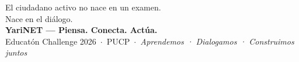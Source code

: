 \documentclass[a4paper, 11pt]{article}
\begin{document}
\vspace{6pt}
\begin{tcolorbox}[
  enhanced,
  colback=yblue,
  colframe=yblue,
  arc=4mm,
  boxrule=0pt,
  left=16pt, right=16pt, top=12pt, bottom=12pt,
  halign=center
]
{\color{white}\fontsize{11}{15}\selectfont
El ciudadano activo no nace en un examen.\\Nace en el di\'{a}logo.}\\[8pt]
{\color{ygold}\fontsize{13}{16}\selectfont\textbf{YariNET --- Piensa. Conecta. Act\'{u}a.}}\\[6pt]
{\color{white!60!yblue}\small
Educat\'{o}n Challenge 2026\ $\cdot$\ PUCP\ $\cdot$\
\textit{Aprendemos · Dialogamos · Construimos juntos}}
\end{tcolorbox}
\end{document}

